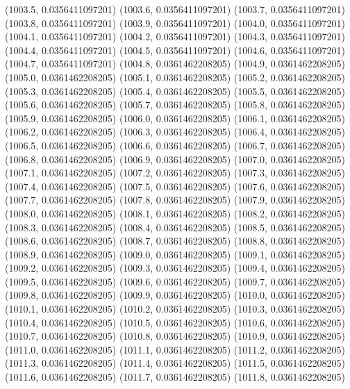 {					(1003.5, 0.0356411097201)
					(1003.6, 0.0356411097201)
					(1003.7, 0.0356411097201)
					(1003.8, 0.0356411097201)
					(1003.9, 0.0356411097201)
					(1004.0, 0.0356411097201)
					(1004.1, 0.0356411097201)
					(1004.2, 0.0356411097201)
					(1004.3, 0.0356411097201)
					(1004.4, 0.0356411097201)
					(1004.5, 0.0356411097201)
					(1004.6, 0.0356411097201)
					(1004.7, 0.0356411097201)
					(1004.8, 0.0361462208205)
					(1004.9, 0.0361462208205)
					(1005.0, 0.0361462208205)
					(1005.1, 0.0361462208205)
					(1005.2, 0.0361462208205)
					(1005.3, 0.0361462208205)
					(1005.4, 0.0361462208205)
					(1005.5, 0.0361462208205)
					(1005.6, 0.0361462208205)
					(1005.7, 0.0361462208205)
					(1005.8, 0.0361462208205)
					(1005.9, 0.0361462208205)
					(1006.0, 0.0361462208205)
					(1006.1, 0.0361462208205)
					(1006.2, 0.0361462208205)
					(1006.3, 0.0361462208205)
					(1006.4, 0.0361462208205)
					(1006.5, 0.0361462208205)
					(1006.6, 0.0361462208205)
					(1006.7, 0.0361462208205)
					(1006.8, 0.0361462208205)
					(1006.9, 0.0361462208205)
					(1007.0, 0.0361462208205)
					(1007.1, 0.0361462208205)
					(1007.2, 0.0361462208205)
					(1007.3, 0.0361462208205)
					(1007.4, 0.0361462208205)
					(1007.5, 0.0361462208205)
					(1007.6, 0.0361462208205)
					(1007.7, 0.0361462208205)
					(1007.8, 0.0361462208205)
					(1007.9, 0.0361462208205)
					(1008.0, 0.0361462208205)
					(1008.1, 0.0361462208205)
					(1008.2, 0.0361462208205)
					(1008.3, 0.0361462208205)
					(1008.4, 0.0361462208205)
					(1008.5, 0.0361462208205)
					(1008.6, 0.0361462208205)
					(1008.7, 0.0361462208205)
					(1008.8, 0.0361462208205)
					(1008.9, 0.0361462208205)
					(1009.0, 0.0361462208205)
					(1009.1, 0.0361462208205)
					(1009.2, 0.0361462208205)
					(1009.3, 0.0361462208205)
					(1009.4, 0.0361462208205)
					(1009.5, 0.0361462208205)
					(1009.6, 0.0361462208205)
					(1009.7, 0.0361462208205)
					(1009.8, 0.0361462208205)
					(1009.9, 0.0361462208205)
					(1010.0, 0.0361462208205)
					(1010.1, 0.0361462208205)
					(1010.2, 0.0361462208205)
					(1010.3, 0.0361462208205)
					(1010.4, 0.0361462208205)
					(1010.5, 0.0361462208205)
					(1010.6, 0.0361462208205)
					(1010.7, 0.0361462208205)
					(1010.8, 0.0361462208205)
					(1010.9, 0.0361462208205)
					(1011.0, 0.0361462208205)
					(1011.1, 0.0361462208205)
					(1011.2, 0.0361462208205)
					(1011.3, 0.0361462208205)
					(1011.4, 0.0361462208205)
					(1011.5, 0.0361462208205)
					(1011.6, 0.0361462208205)
					(1011.7, 0.0361462208205)
					(1011.8, 0.0361462208205)
}

